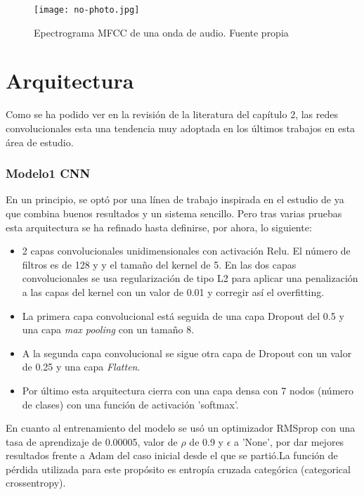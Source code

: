 \documentclass[11pt,a4paper,spanish]{book}
\begin{document}
	\begin{figure}[H]
		\centering
		\texttt{[image: no-photo.jpg]} 
		\caption{Epectrograma MFCC de una onda de audio. Fuente propia}
		\label{fig:mfcc_sample}
	\end{figure}
	
	
	\section{Arquitectura}
	\label{sec:arquitectura_cap4}
	Como se ha podido ver en la revisión de la literatura del capítulo 2, las redes convolucionales esta una tendencia muy adoptada en los últimos trabajos en esta área de estudio.
	
	
	\subsubsection{Modelo1 CNN}
	En un principio, se optó por una línea de trabajo inspirada en el estudio de \cite{AbdulQayyum2019} ya que combina buenos resultados y un sistema sencillo. Pero tras varias pruebas esta arquitectura se ha refinado hasta definirse, por ahora, lo siguiente:
	
	\begin{itemize}
		\item 2 capas convolucionales unidimensionales con activación Relu. El número de filtros es de 128 y  y el tamaño del kernel de 5.
		En las dos capas convolucionales se usa regularización de tipo L2 para aplicar una penalización a las capas del kernel con un valor de 0.01 y corregir así el overfitting.
		
		\item La primera capa convolucional está seguida de una capa Dropout del 0.5 y una capa \emph{max pooling} con un tamaño 8.
		
		\item A la segunda capa convolucional se sigue otra capa de Dropout con un valor de 0.25 y una capa \emph{Flatten}.
		
		\item Por último esta arquitectura cierra con una capa densa con 7 nodos (número de clases) con una función de activación 'softmax'.
	\end{itemize}
	En cuanto al entrenamiento del modelo se usó un optimizador RMSprop con una tasa de aprendizaje de 0.00005, valor de $\rho$ de 0.9 y $\epsilon$ a 'None', por dar mejores resultados frente a Adam del caso inicial desde el que se partió.La función de pérdida utilizada para este propósito es entropía cruzada categórica (categorical crossentropy).\\
	
\end{document}
